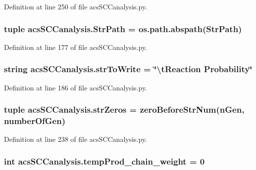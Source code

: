 Definition at line 250 of file acs\-S\-C\-Canalysis.\-py.

\hypertarget{a00102_af8add8b37a9c8a7825c0e8f0e7dfd6c1}{
\subsubsection[{Str\-Path}]{\setlength{\rightskip}{0pt plus 5cm}tuple acs\-S\-C\-Canalysis.\-Str\-Path = os.\-path.\-abspath(Str\-Path)}}\label{a00102_af8add8b37a9c8a7825c0e8f0e7dfd6c1}


Definition at line 177 of file acs\-S\-C\-Canalysis.\-py.

\hypertarget{a00102_a1966f0657c6b477eeb60bde732a201cc}{
\subsubsection[{str\-To\-Write}]{\setlength{\rightskip}{0pt plus 5cm}string acs\-S\-C\-Canalysis.\-str\-To\-Write = \char`\"{}\textbackslash{}t\-Reaction Probability\char`\"{}}}\label{a00102_a1966f0657c6b477eeb60bde732a201cc}


Definition at line 186 of file acs\-S\-C\-Canalysis.\-py.

\hypertarget{a00102_a8ba6aefb71b3d1e575eac38627f143d6}{
\subsubsection[{str\-Zeros}]{\setlength{\rightskip}{0pt plus 5cm}tuple acs\-S\-C\-Canalysis.\-str\-Zeros = {\bf zero\-Before\-Str\-Num}(n\-Gen, {\bf number\-Of\-Gen})}}\label{a00102_a8ba6aefb71b3d1e575eac38627f143d6}


Definition at line 238 of file acs\-S\-C\-Canalysis.\-py.

\hypertarget{a00102_aaf17c99825e0961e4cfaa173ddfffe84}{
\subsubsection[{temp\-Prod\-\_\-chain\-\_\-weight}]{\setlength{\rightskip}{0pt plus 5cm}int acs\-S\-C\-Canalysis.\-temp\-Prod\-\_\-chain\-\_\-weight = 0}}\label{a00102_aaf17c99825e0961e4cfaa173ddfffe84}


